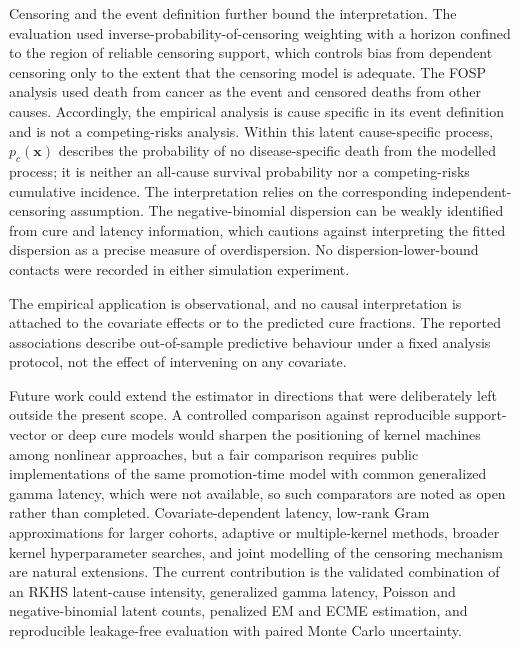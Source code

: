 Censoring and the event definition further bound the interpretation. The evaluation used
inverse-probability-of-censoring weighting with a horizon confined to the region of reliable censoring
support, which controls bias from dependent censoring only to the extent that the censoring model is
adequate. The FOSP analysis used death from cancer as the event
and censored deaths from other causes. Accordingly, the empirical analysis is cause specific in its event
definition and is not a competing-risks analysis. Within this latent cause-specific process,
$p_c(\bm{x})$ describes the probability of no disease-specific death from the modelled process; it is
neither an all-cause survival probability nor a competing-risks cumulative incidence. The interpretation
relies on the corresponding independent-censoring assumption. The negative-binomial dispersion can be
weakly identified from cure and latency information, which cautions against interpreting the fitted
dispersion as a precise measure of overdispersion. No dispersion-lower-bound contacts were recorded
in either simulation experiment.

The empirical application is observational, and no causal interpretation is attached to the covariate effects
or to the predicted cure fractions. The reported associations describe out-of-sample predictive behaviour under
a fixed analysis protocol, not the effect of intervening on any covariate.

Future work could extend the estimator in directions that were deliberately left outside the present scope.
A controlled comparison against reproducible support-vector or deep cure models would sharpen the
positioning of kernel machines among nonlinear approaches, but a fair comparison requires public
implementations of the same promotion-time model with common generalized gamma latency, which were not
available, so such comparators are noted as open rather than completed. Covariate-dependent latency,
low-rank Gram approximations for larger cohorts, adaptive or multiple-kernel methods, broader kernel
hyperparameter searches, and joint modelling of the censoring mechanism are natural extensions. The current
contribution is the validated combination of an RKHS latent-cause intensity, generalized gamma latency,
Poisson and negative-binomial latent counts, penalized EM and ECME estimation, and reproducible
leakage-free evaluation with paired Monte Carlo uncertainty.
